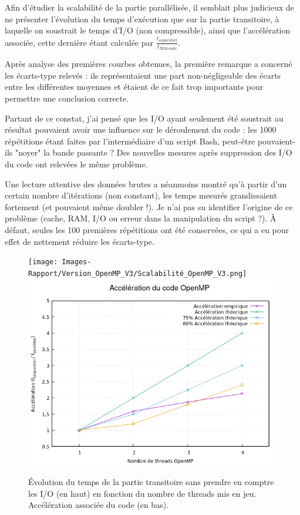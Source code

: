 \documentclass[11pt,a4paper,oneside]{memoir}
\theoremstyle{definition}
\theoremstyle{remark}
\theoremstyle{plain}
\begin{document}
Afin d'étudier la scalabilité de la partie parallélisée, il semblait plus judicieux de ne présenter l'évolution du temps d'exécution que sur la partie transitoire, à laquelle on soustrait le temps d'I/O (non compressible), ainsi que l'accélération associée, cette dernière étant calculée par $\frac{t_{sequentiel}}{t_{X threads}}$.

Après analyse des premières courbes obtenues, la première remarque a concerné les écarts-type relevés : ils représentaient une part non-négligeable des écarts entre les différentes moyennes et étaient de ce fait trop importants pour permettre une conclusion correcte.

Partant de ce constat, j'ai pensé que les I/O ayant seulement été soustrait au résultat pouvaient avoir une influence sur le déroulement du code : les 1000 répétitions étant faites par l'intermédiaire d'un script Bash, peut-être pouvaient-ils "noyer" la bande passante ? Des nouvelles mesures après suppression des I/O du code ont relevées le même problème.

Une lecture attentive des données brutes a néanmoins montré qu'à partir d'un certain nombre d'itérations (non constant), les temps mesurés grandissaient fortement (et pouvaient même doubler !). Je n'ai pas su identifier l'origine de ce problème (cache, RAM, I/O ou erreur dans la manipulation du script ?). \`A défaut, seules les 100 premières répétitions ont été conservées, ce qui a eu pour effet de nettement réduire les écarts-type.\bigskip

\begin{figure}
\begin{center}
\texttt{[image: Images-Rapport/Version\_OpenMP\_V3/Scalabilité\_OpenMP\_V3.png]}
\includegraphics[scale=0.65]{Images-Rapport/Version_OpenMP_V3/Accélération_OpenMP_V3.png}
\caption{\'Evolution du temps de la partie transitoire sans prendre en comptre les I/O (en haut) en fonction du nombre de threads mis en jeu. Accélération associée du code (en bas).}
\label{scalabilité_speedup}
\end{center}
\end{figure}
\end{document}
